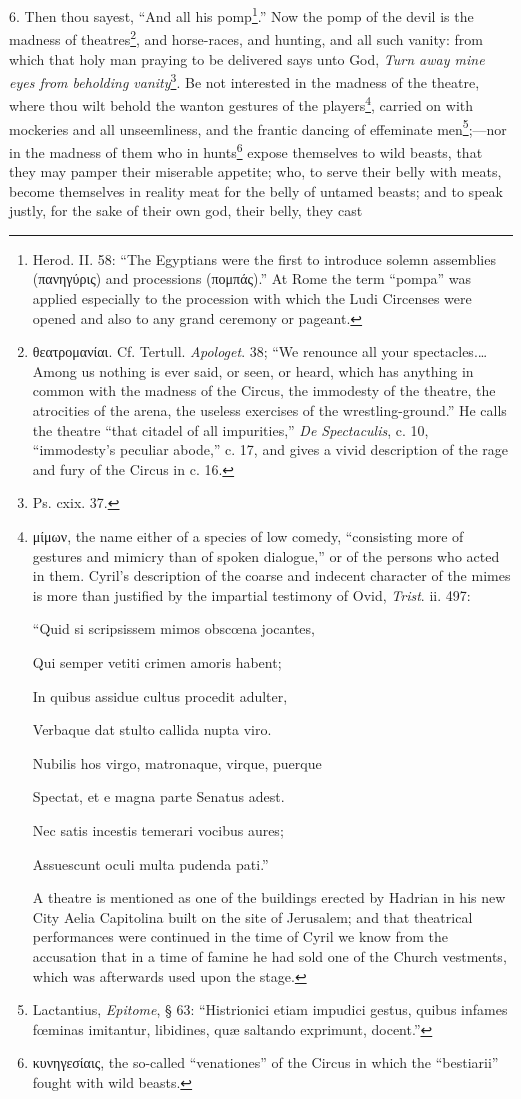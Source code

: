 6. Then thou sayest, “And all his pomp\footnote{Herod. II. 58: “The Egyptians were the first to introduce solemn assemblies (\textgreek{πανηγύρις}) and processions (\textgreek{πομπάς}).” At Rome the term “pompa” was applied especially to the procession with which the Ludi Circenses were opened and also to any grand ceremony or pageant.}.” Now the pomp of the devil is the madness of theatres\footnote{\textgreek{θεατρομανίαι}. Cf. Tertull. \emph{Apologet}. 38; “We renounce all your spectacles.…Among us nothing is ever said, or seen, or heard, which has anything in common with the madness of the Circus, the immodesty of the theatre, the atrocities of the arena, the useless exercises of the wrestling-ground.” He calls the theatre “that citadel of all impurities,” \emph{De Spectaculis}, c. 10, “immodesty’s peculiar abode,” c. 17, and gives a vivid description of the rage and fury of the Circus in c. 16.}, and horse-races, and hunting, and all such vanity: from which that holy man praying to be delivered says unto God, \emph{Turn away mine eyes from beholding vanity}\footnote{Ps. cxix. 37.}. Be not interested in the madness of the theatre, where thou wilt behold the wanton gestures of the players\footnote{\textgreek{μίμων}, the name either of a species of low comedy, “consisting more of gestures and mimicry than of spoken dialogue,” or of the persons who acted in them. Cyril’s description of the coarse and indecent character of the mimes is more than justified by the impartial testimony of Ovid, \emph{Trist}. ii. 497: \par “Quid si scripsissem mimos obscœna jocantes, \par Qui semper vetiti crimen amoris habent; \par In quibus assidue cultus procedit adulter, \par Verbaque dat stulto callida nupta viro. \par Nubilis hos virgo, matronaque, virque, puerque \par Spectat, et e magna parte Senatus adest. \par Nec satis incestis temerari vocibus aures; \par Assuescunt oculi multa pudenda pati.” \par A theatre is mentioned as one of the buildings erected by Hadrian in his new City Aelia Capitolina built on the site of Jerusalem; and that theatrical performances were continued in the time of Cyril we know from the accusation that in a time of famine he had sold one of the Church vestments, which was afterwards used upon the stage.}, carried on with mockeries and all unseemliness, and the frantic dancing of effeminate men\footnote{Lactantius, \emph{Epitome}, § 63: “Histrionici etiam impudici gestus, quibus infames fœminas imitantur, libidines, quæ saltando exprimunt, docent.”};—nor in the madness of them who in hunts\footnote{\textgreek{κυνηγεσίαις}, the so-called “venationes” of the Circus in which the “bestiarii” fought with wild beasts.} expose themselves to wild beasts, that they may pamper their miserable appetite; who, to serve their belly with meats, become themselves in reality meat for the belly of untamed beasts; and to speak justly, for the sake of their own god, their belly, they cast 